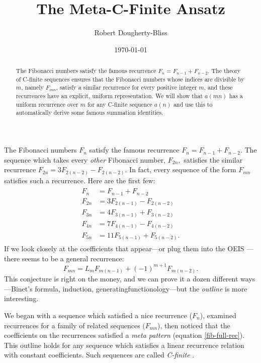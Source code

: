 \documentclass[12pt]{article}
\title{The Meta-C-Finite Ansatz}
\author{Robert Dougherty-Bliss}
\date{\today}
\begin{document}
\maketitle

\begin{abstract}
    \noindent The Fibonacci numbers satisfy the famous recurrence $F_n = F_{n -
    1} + F_{n - 2}$. The theory of C-finite sequences ensures that the
    Fibonacci numbers whose indices are divisible by $m$, namely $F_{mn}$,
    satisfy a similar recurrence for every positive integer $m$, and these
    recurrences have an explicit, uniform representation. We will show that
    $a(mn)$ has a uniform recurrence over $m$ for any C-finite sequence $a(n)$
    and use this to automatically derive some famous summation identities.
\end{abstract}

\noindent The Fibonacci numbers $F_n$ satisfy the famous recurrence $F_n = F_{n
- 1} + F_{n - 2}$. The sequence which takes every \emph{other} Fibonacci
number, $F_{2n},$ satisfies the similar recurrence $F_{2n} = 3 F_{2(n - 2)} -
F_{2(n - 2)}$. In fact, every sequence of the form $F_{mn}$ satisfies such a
recurrence. Here are the first few:
\begin{align}
    \label{fib-rec}
    \begin{split}
        F_{n} &= F_{n - 1} + F_{n - 2} \\
        F_{2n} &= 3 F_{2(n - 1)} - F_{2(n - 2)} \\
        F_{3n} &= 4 F_{3(n - 1)} + F_{3(n - 2)} \\
        F_{4n} &= 7 F_{4(n - 1)} - F_{4(n - 2)} \\
        F_{5n} &= 11 F_{5(n - 1)} + F_{5(n - 2)}.
    \end{split}
\end{align}
If we look closely at the coefficients that appear---or plug them into the OEIS
\cite{oeis}---there seems to be a general recurrence:
\begin{equation}
    \label{fib-full-rec}
    F_{mn} = L_m F_{m(n - 1)} + (-1)^{m + 1} F_{m(n - 2)}.
\end{equation}
This conjecture is right on the money, and we can prove it a dozen different
ways---Binet's formula, induction, generatingfunctionology---but the
\emph{outline} is more interesting.

We began with a sequence which satisfied a nice recurrence ($F_n$), examined
recurrences for a family of related sequences $(F_{mn}$), then noticed that the
coefficients on the recurrences satisfied a \emph{meta pattern} (equation
\eqref{fib-full-rec}). This outline holds for any sequence which satisfies a
linear recurrence relation with constant coefficients. Such sequences are
called \emph{C-finite} \cite{ansatz, concrete}.
\end{document}
